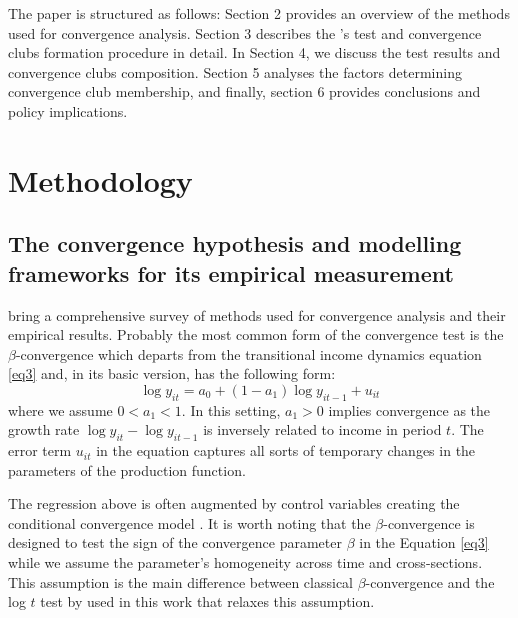 \documentclass[11pt]{article}
\begin{document}
The paper is structured as follows: Section 2 provides an overview of the methods used for convergence analysis. Section 3 describes the \citeauthor{phillips2007transition}'s test and convergence clubs formation procedure in detail. In Section 4, we discuss the test results and convergence clubs composition. Section 5 analyses the factors determining convergence club membership, and finally, section 6 provides conclusions and policy implications.  


\section{Methodology}\label{Methodology}
\subsection{The convergence hypothesis and modelling frameworks for its empirical measurement}

\citet{eckey2007convergence} bring a comprehensive survey of methods used for convergence analysis and their empirical results. Probably the most common form of the convergence test is the $\beta$-convergence which departs from the transitional income dynamics equation \eqref{eq3} and, in its basic version, has the following form:
\begin{equation} \label{eq1}\log y_{it} = a_{0} + (1 - a_{1})\log y_{it-1} + u_{it} \end{equation}
where we assume \(0 < a_{1} < 1\). In this setting, \(a_{1} > 0 \) implies convergence as the growth rate \(\log y_{it} - \log y_{it-1}\) is inversely related to income in period $t$. The error term $u_{it}$ in the equation captures all sorts of temporary changes in the parameters of the production function.

The regression above is often augmented by control variables creating the conditional convergence model \citep{sala1996regional}. It is worth noting that the $\beta$-convergence is designed to test the sign of the convergence parameter $\beta$ in the Equation \ref{eq3} while we assume the parameter's homogeneity across time and cross-sections. This assumption is the main difference between classical  $\beta$-convergence and the log $t$ test by \citet{phillips2007transition} used in this work that relaxes this assumption.
\end{document}
